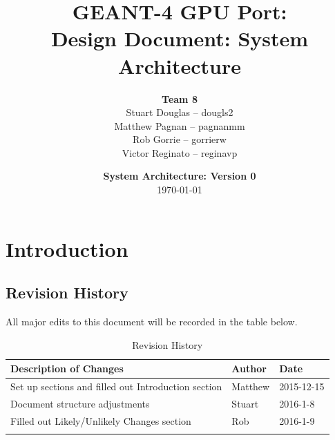 \documentclass[12pt]{article}
\title{
\LARGE GEANT-4 GPU Port:
\\\vspace{10mm}
\large \textbf{Design Document: System Architecture}
\vspace{40mm}
}
\author{
\textbf{Team 8}
\\Stuart Douglas -- dougls2
\\Matthew Pagnan -- pagnanmm
\\Rob Gorrie -- gorrierw
\\Victor Reginato -- reginavp
\vspace{10mm}
}
\date{\vfill \textbf{System Architecture: Version 0}\\ \today}
\begin{document}

\maketitle
\newpage

\renewcommand{\contentsname}{Table of Contents}
\tableofcontents
\newpage
{}

\section{Introduction}%
\subsection{Revision History}
All major edits to this document will be recorded in the table below.

\begin{table}[h]
\centering
\caption{Revision History}\label{Table_Revision}
\begin{tabularx}{\textwidth}{Xll}
\toprule
\bf Description of Changes & \bf Author & \bf Date\\\midrule
\arrayrulecolor{lightgray}
Set up sections and filled out Introduction section & Matthew & 2015-12-15\\\hline
Document structure adjustments & Stuart & 2016-1-8\\\hline
Filled out Likely/Unlikely Changes section & Rob & 2016-1-9\\
\arrayrulecolor{black}
\bottomrule
\end{tabularx}
\end{table}
\end{document}
